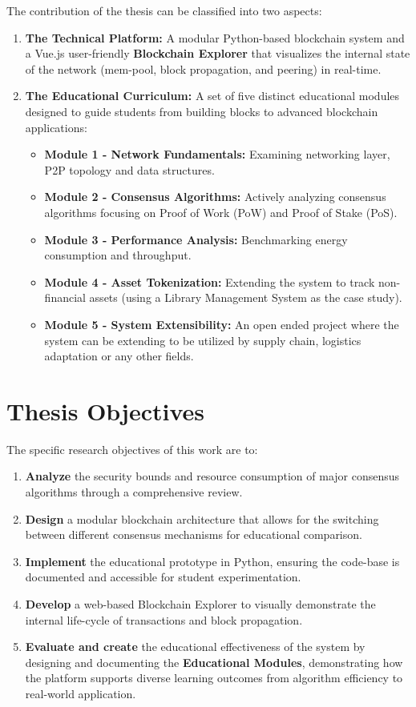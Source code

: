 The contribution of the thesis can be classified into two aspects:
\begin{enumerate}
    \item \textbf{The Technical Platform:} A modular Python-based blockchain system and a Vue.js user-friendly \textbf{Blockchain Explorer} that visualizes the internal state of the network (mem-pool, block propagation, and peering) in real-time.
    \item \textbf{The Educational Curriculum:} A set of five distinct educational modules designed to guide students from building blocks to advanced blockchain applications:
    \begin{itemize}
        \item \textbf{Module 1 - Network Fundamentals:} Examining networking layer, P2P topology and data structures.
        \item \textbf{Module 2 - Consensus Algorithms:} Actively analyzing consensus algorithms focusing on Proof of Work (PoW) and Proof of Stake (PoS).
        \item \textbf{Module 3 - Performance Analysis:} Benchmarking energy consumption and throughput.
        \item \textbf{Module 4 - Asset Tokenization:} Extending the system to track non-financial assets (using a Library Management System as the case study).
        \item \textbf{Module 5 - System Extensibility:} An open ended project where the system can be extending to be utilized by supply chain, logistics adaptation or any other fields.
    \end{itemize}
\end{enumerate}

\section{Thesis Objectives} \label{ch1_objectives}

The specific research objectives of this work are to:
\begin{enumerate}
    \item \textbf{Analyze} the security bounds and resource consumption of major consensus algorithms through a comprehensive review.
    \item \textbf{Design} a modular blockchain architecture that allows for the switching between different consensus mechanisms for educational comparison.
    \item \textbf{Implement} the educational prototype in Python, ensuring the code-base is documented and accessible for student experimentation.
    \item \textbf{Develop} a web-based Blockchain Explorer to visually demonstrate the internal life-cycle of transactions and block propagation.
    \item \textbf{Evaluate and create} the educational effectiveness of the system by designing and documenting the \textbf{Educational Modules}, demonstrating how the platform supports diverse learning outcomes from algorithm efficiency to real-world application.
\end{enumerate}